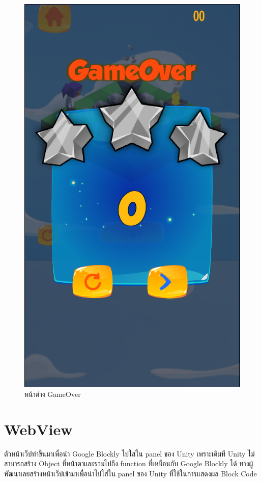 \begin{figure}
\begin{center}
\includegraphics[scale = 0.4]{pic/GameOver1.png}
\end{center}
\caption[หน้าต่าง GameOver]{หน้าต่าง GameOver}
\label{lose}
\end{figure}



\section{WebView}
ตัวหน้าเว็ปทำขึ้นมาเพื่อนำ Google Blockly ไปใส่ใน panel ของ Unity เพราะเดิมที Unity ไม่สามารถสร้าง Object ที่หน้าตาและรวมไปถึง function ที่เหมือนกับ Google Blockly ได้ ทางผู้พัฒนาเลยสร้างหน้าเว็ปเข้ามาเพื่อนำไปใส่ใน 
panel ของ Unity ที่ใช้ในการแสดงผล Block Code


